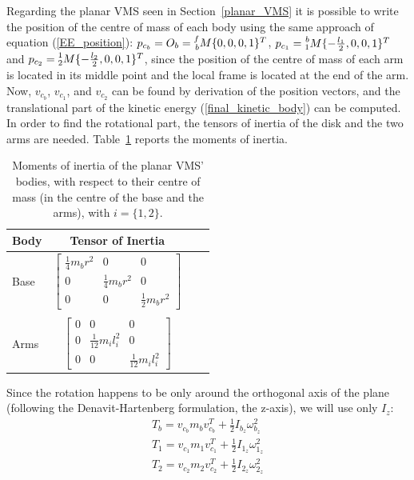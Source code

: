 \documentclass[a4paper,12pt,oneside]{report}
\begin{document}
Regarding the planar VMS seen in Section~\ref{planar_VMS} it is possible to write the position of the centre of mass of each body using the same approach of equation (\ref{EE_position}): $p_{c_b}=O_b=\prescript{f}{b}{M}\{0,0,0,1\}^T$, $p_{c_1}=\prescript{b}{1}{M}\{-\frac{l_1}{2},0,0,1\}^T$ and $p_{c_2}=\prescript{1}{2}{M}\{-\frac{l_2}{2},0,0,1\}^T$, since the position of the centre of mass of each arm is located in its middle point and the local frame is located at the end of the arm.\\
Now, $v_{c_b}$, $v_{c_1}$, and $v_{c_2}$ can be found by derivation of the position vectors, and the translational part of the kinetic energy (\ref{final_kinetic_body}) can be computed.\\
In order to find the rotational part, the tensors of inertia of the disk and the two arms are needed. Table~\ref{inertia_moments} reports the moments of inertia.\\
\begin{table}
  \caption{Moments of inertia of the planar VMS' bodies, with respect to their centre of mass (in the centre of the base and the arms), with $i=\{1,2\}$.}
  \label{inertia_moments}
  \begin{center}
  \begin{tabular}{lccc}
    \toprule
  \textbf{Body} & \textbf{Tensor of Inertia}\\
  \midrule
  Base&$\begin{bmatrix}
    \frac{1}{4}m_br^2&0&0\\
    0&\frac{1}{4}m_br^2&0\\
    0&0&\frac{1}{2}m_br^2
  \end{bmatrix}$\\
  \\
  Arms&$\begin{bmatrix}
    0&0&0\\
    0&\frac{1}{12}m_il_i^2&0\\
    0&0&\frac{1}{12}m_il_i^2
  \end{bmatrix}$\\
  \bottomrule
  \end{tabular}
  \end{center}
  \end{table}
Since the rotation happens to be only around the orthogonal axis of the plane (following the Denavit-Hartenberg formulation, the z-axis), we will use only $I_z$:
\begin{equation}
  \begin{array}{l}
  T_b=v_{c_b}m_bv_{c_b}^T+\frac{1}{2}I_{b_z}\omega_{b_z}^2\\
  T_1=v_{c_1}m_1v_{c_1}^T+\frac{1}{2}I_{1_z}\omega_{1_z}^2\\
  T_2=v_{c_2}m_2v_{c_2}^T+\frac{1}{2}I_{2_z}\omega_{2_z}^2
  \end{array}
  \label{kin_energy}
\end{equation}
\end{document}
